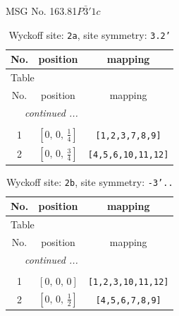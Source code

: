 \documentclass[fleqn,8pt]{jsarticle}
\begin{document}
\setcounter{MaxMatrixCols}{32}

\renewcommand{\tablename}{Table~}
\renewcommand{\figurename}{Figure~}
\begin{center}
\LARGE
MSG No. 163.81\quad$P\bar{3}'1c$
\end{center}
\renewcommand{\arraystretch}{1.2}
\begin{longtable}{ccc}
\caption{Wyckoff site: {\tt 2a}, site symmetry: {\tt 3.2'}}
 \\
 \hline \hline
No. & position & mapping \\ \hline \endfirsthead

\multicolumn{2}{l}{\tablename\ \thetable{}} \\
 \hline \hline
No. & position & mapping \\ \hline \endhead

 \hline \hline
\multicolumn{2}{r}{\footnotesize\it continued ...} \\ \endfoot

 \hline \hline
\multicolumn{2}{r}{} \\ \endlastfoot

1 & $\left[ 0,\, 0,\, \frac{1}{4} \right]$ & {\tt [1,2,3,7,8,9]} \\ \hline
2 & $\left[ 0,\, 0,\, \frac{3}{4} \right]$ & {\tt [4,5,6,10,11,12]} \\
\end{longtable}
\renewcommand{\arraystretch}{1.2}
\begin{longtable}{ccc}
\caption{Wyckoff site: {\tt 2b}, site symmetry: {\tt -3'..}}
 \\
 \hline \hline
No. & position & mapping \\ \hline \endfirsthead

\multicolumn{2}{l}{\tablename\ \thetable{}} \\
 \hline \hline
No. & position & mapping \\ \hline \endhead

 \hline \hline
\multicolumn{2}{r}{\footnotesize\it continued ...} \\ \endfoot

 \hline \hline
\multicolumn{2}{r}{} \\ \endlastfoot

1 & $\left[ 0,\, 0,\, 0 \right]$ & {\tt [1,2,3,10,11,12]} \\ \hline
2 & $\left[ 0,\, 0,\, \frac{1}{2} \right]$ & {\tt [4,5,6,7,8,9]} \\
\end{longtable}
\end{document}
